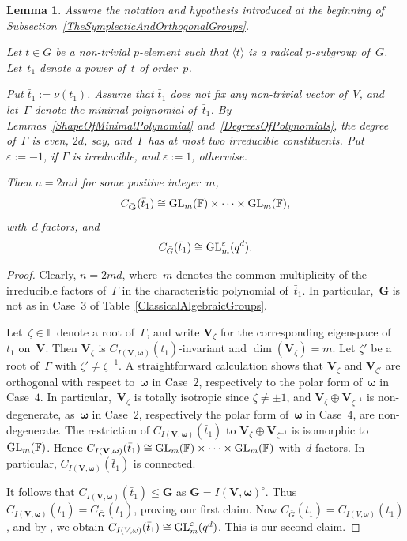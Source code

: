 \documentclass[12pt]{amsart}
\newcommand{\bG}{{\mathbf{G}}}      %
\newcommand{\bV}{{\mathbf{V}}}
\def\GL{ \text{\rm GL} }
\newtheorem{lem}[thm]{Lemma}
\theoremstyle{theorem}
\theoremstyle{definition}
\theoremstyle{remark}
\begin{document}
\begin{lem}
\label{NonTypeAClassicalGroups0}
Assume the notation and hypothesis introduced at the beginning of 
{\rm Subsection~\ref{TheSymplecticAndOrthogonalGroups}}.

Let $t \in G$ be a non-trivial $p$-element such that $\langle t \rangle$ is a 
radical $p$-subgroup of~$G$. Let~$t_1$ denote a power of~$t$ of order~$p$.

Put $\bar{t}_1 := \nu(t_1)$. Assume that $\bar{t}_1$ does not fix any
non-trivial vector of~$V$, and let~$\Gamma$ denote the minimal polynomial
of~$\bar{t}_1$. By {\rm Lemmas~\ref{ShapeOfMinimalPolynomial}} 
and~{\rm \ref{DegreesOfPolynomials}}, the degree 
of~$\Gamma$ is even, $2d$, say, and~$\Gamma$ has at most two irreducible 
constituents. Put $\varepsilon := -1$, if $\Gamma$ is irreducible, and 
$\varepsilon := 1$, otherwise.

Then $n = 2md$ for some positive integer~$m$, 
$$C_{\bar{\bG}}( \bar{t}_1 ) \cong 
\GL_m( \mathbb{F} ) \times \cdots \times \GL_m( \mathbb{F} ),$$
with~$d$ factors, and 
$$C_{\bar{G}}( \bar{t}_1 ) \cong \GL^\varepsilon_m( q^d ).$$
\end{lem}
\begin{proof}
Clearly, $n = 2md$, where~$m$ denotes the common multiplicity of the irreducible
factors of~$\Gamma$ in the characteristic polynomial of~$\bar{t}_1$. In 
particular,~$\bG$ is not as in Case~$3$ of Table~\ref{ClassicalAlgebraicGroups}. 

Let~$\zeta \in \mathbb{F}$ denote a root of~$\Gamma$, and write $\bV_{\zeta}$ 
for the corresponding eigenspace of~$\bar{t}_1$ on~$\bV$. Then $\bV_{\zeta}$ is 
$C_{I(\bV,\boldsymbol{\omega})}( \bar{t}_1 )$-invariant and 
$\dim( \bV_{\zeta} ) = m$. Let $\zeta'$ be a root of~$\Gamma$ with 
$\zeta' \neq \zeta^{-1}$. A straightforward calculation shows that 
$\bV_{\zeta}$ and $\bV_{\zeta'}$ are orthogonal with respect 
to~$\boldsymbol{\omega}$ in Case~$2$, respectively to the polar form 
of~$\boldsymbol{\omega}$ in Case~$4$. In particular,~$\bV_{\zeta}$ is totally 
isotropic since $\zeta \neq \pm1$, and $\bV_{\zeta} \oplus \bV_{\zeta^{-1}}$ is 
non-degenerate, as~$\boldsymbol{\omega}$ in Case~$2$, respectively the polar 
form of~$\boldsymbol{\omega}$ in Case~$4$, are non-degenerate.  
The restriction of $C_{I(\bV,\boldsymbol{\omega})}( \bar{t}_1 )$ to 
$\bV_{\zeta} \oplus \bV_{\zeta^{-1}}$ is isomorphic to $\GL_m( \mathbb{F} )$. 
Hence
$C_{I(\bV,\boldsymbol{\omega})}( \bar{t}_1 ) \cong 
\GL_m( \mathbb{F} ) \times \cdots \times \GL_m( \mathbb{F} )$ with~$d$ factors. 
In particular, $C_{I(\bV,\boldsymbol{\omega})}( \bar{t}_1 )$ is connected.

It follows that $C_{I(\bV,\boldsymbol{\omega})}( \bar{t}_1 ) \leq \bar{\bG}$ as
$\bar{\bG} = I(\bV,\boldsymbol{\omega})^{\circ}$. Thus
$C_{I(\bV,\boldsymbol{\omega})}( \bar{t}_1 ) = C_{\bar{\bG}}( \bar{t}_1 )$,
proving our first claim. Now $C_{\bar{G}}( \bar{t}_1 ) = 
C_{I(V,\omega)}( \bar{t}_1 )$, and by \cite[Theorem~$6.1.2$]{FLO}, we obtain
$C_{I(V,\omega)}( \bar{t}_1 ) \cong \GL^\varepsilon_m( q^d )$. This is our 
second claim.
\end{proof}
\end{document}
